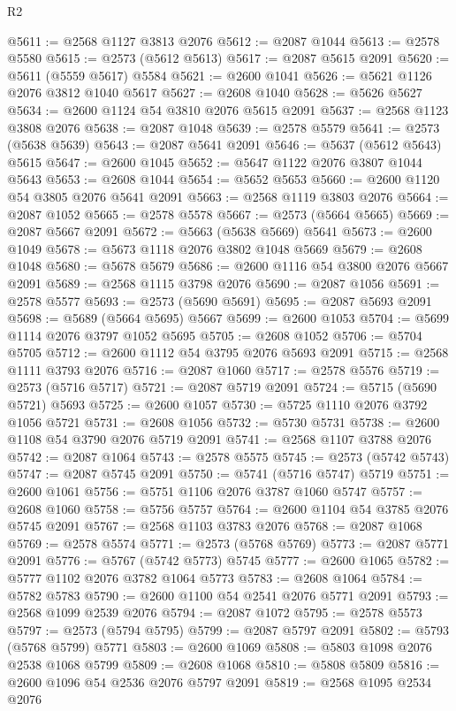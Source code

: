 \begin{lexlean}{R2}
\begin{coremodule}
@5611 := @2568 @1127 @3813 @2076
@5612 := @2087 @1044
@5613 := @2578 @5580
@5615 := @2573 (@5612 @5613)
@5617 := @2087 @5615 @2091
@5620 := @5611 (@5559 @5617) @5584
@5621 := @2600 @1041
@5626 := @5621 @1126 @2076 @3812 @1040 @5617
@5627 := @2608 @1040
@5628 := @5626 @5627
@5634 := @2600 @1124 @54 @3810 @2076 @5615 @2091
@5637 := @2568 @1123 @3808 @2076
@5638 := @2087 @1048
@5639 := @2578 @5579
@5641 := @2573 (@5638 @5639)
@5643 := @2087 @5641 @2091
@5646 := @5637 (@5612 @5643) @5615
@5647 := @2600 @1045
@5652 := @5647 @1122 @2076 @3807 @1044 @5643
@5653 := @2608 @1044
@5654 := @5652 @5653
@5660 := @2600 @1120 @54 @3805 @2076 @5641 @2091
@5663 := @2568 @1119 @3803 @2076
@5664 := @2087 @1052
@5665 := @2578 @5578
@5667 := @2573 (@5664 @5665)
@5669 := @2087 @5667 @2091
@5672 := @5663 (@5638 @5669) @5641
@5673 := @2600 @1049
@5678 := @5673 @1118 @2076 @3802 @1048 @5669
@5679 := @2608 @1048
@5680 := @5678 @5679
@5686 := @2600 @1116 @54 @3800 @2076 @5667 @2091
@5689 := @2568 @1115 @3798 @2076
@5690 := @2087 @1056
@5691 := @2578 @5577
@5693 := @2573 (@5690 @5691)
@5695 := @2087 @5693 @2091
@5698 := @5689 (@5664 @5695) @5667
@5699 := @2600 @1053
@5704 := @5699 @1114 @2076 @3797 @1052 @5695
@5705 := @2608 @1052
@5706 := @5704 @5705
@5712 := @2600 @1112 @54 @3795 @2076 @5693 @2091
@5715 := @2568 @1111 @3793 @2076
@5716 := @2087 @1060
@5717 := @2578 @5576
@5719 := @2573 (@5716 @5717)
@5721 := @2087 @5719 @2091
@5724 := @5715 (@5690 @5721) @5693
@5725 := @2600 @1057
@5730 := @5725 @1110 @2076 @3792 @1056 @5721
@5731 := @2608 @1056
@5732 := @5730 @5731
@5738 := @2600 @1108 @54 @3790 @2076 @5719 @2091
@5741 := @2568 @1107 @3788 @2076
@5742 := @2087 @1064
@5743 := @2578 @5575
@5745 := @2573 (@5742 @5743)
@5747 := @2087 @5745 @2091
@5750 := @5741 (@5716 @5747) @5719
@5751 := @2600 @1061
@5756 := @5751 @1106 @2076 @3787 @1060 @5747
@5757 := @2608 @1060
@5758 := @5756 @5757
@5764 := @2600 @1104 @54 @3785 @2076 @5745 @2091
@5767 := @2568 @1103 @3783 @2076
@5768 := @2087 @1068
@5769 := @2578 @5574
@5771 := @2573 (@5768 @5769)
@5773 := @2087 @5771 @2091
@5776 := @5767 (@5742 @5773) @5745
@5777 := @2600 @1065
@5782 := @5777 @1102 @2076 @3782 @1064 @5773
@5783 := @2608 @1064
@5784 := @5782 @5783
@5790 := @2600 @1100 @54 @2541 @2076 @5771 @2091
@5793 := @2568 @1099 @2539 @2076
@5794 := @2087 @1072
@5795 := @2578 @5573
@5797 := @2573 (@5794 @5795)
@5799 := @2087 @5797 @2091
@5802 := @5793 (@5768 @5799) @5771
@5803 := @2600 @1069
@5808 := @5803 @1098 @2076 @2538 @1068 @5799
@5809 := @2608 @1068
@5810 := @5808 @5809
@5816 := @2600 @1096 @54 @2536 @2076 @5797 @2091
@5819 := @2568 @1095 @2534 @2076

\end{coremodule}
\end{lexlean}
